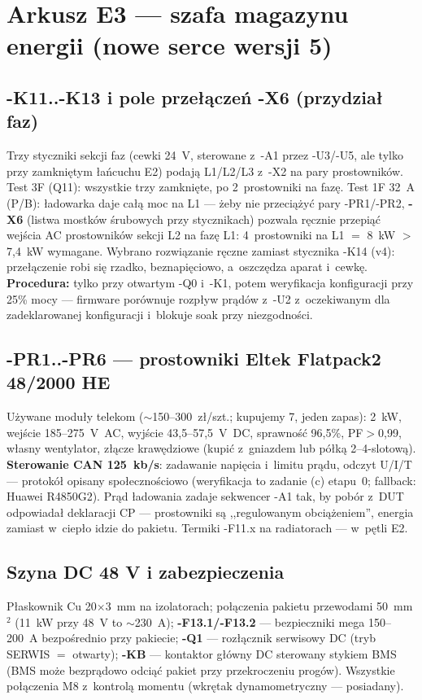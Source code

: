 \documentclass[11pt,a4paper]{article}
\begin{document}
\section{Arkusz E3 --- szafa magazynu energii (nowe serce wersji 5)}

\subsection{-K11..-K13 i pole przełączeń -X6 (przydział faz)}
Trzy styczniki sekcji faz (cewki 24~V, sterowane z~-A1 przez -U3/-U5, ale tylko przy zamkniętym łańcuchu E2)
podają L1/L2/L3 z~-X2 na pary prostowników. Test 3F (Q11): wszystkie trzy zamknięte, po 2~prostowniki na fazę.
Test 1F 32~A (P/B): ładowarka daje całą moc na L1 --- żeby nie przeciążyć pary -PR1/-PR2, \textbf{-X6}
(listwa mostków śrubowych przy stycznikach) pozwala ręcznie przepiąć wejścia AC prostowników sekcji L2 na
fazę L1: 4~prostowniki na L1 $=$ 8~kW $>$ 7,4~kW wymagane. Wybrano rozwiązanie ręczne zamiast stycznika -K14
(v4): przełączenie robi się rzadko, beznapięciowo, a~oszczędza aparat i~cewkę. \textbf{Procedura:} tylko przy
otwartym -Q0 i~-K1, potem weryfikacja konfiguracji przy 25\% mocy --- firmware porównuje rozpływ prądów
z~-U2 z~oczekiwanym dla zadeklarowanej konfiguracji i~blokuje soak przy niezgodności.

\subsection{-PR1..-PR6 --- prostowniki Eltek Flatpack2 48/2000 HE}
Używane moduły telekom ($\sim$150--300~zł/szt.; kupujemy 7, jeden zapas): 2~kW, wejście 185--275~V~AC,
wyjście 43,5--57,5~V~DC, sprawność 96,5\%, PF$>$0,99, własny wentylator, złącze krawędziowe (kupić z~gniazdem
lub półką 2--4-slotową). \textbf{Sterowanie CAN 125~kb/s}: zadawanie napięcia i~limitu prądu, odczyt U/I/T ---
protokół opisany społecznościowo (weryfikacja to zadanie (c) etapu~0; fallback: Huawei R4850G2). Prąd
ładowania zadaje sekwencer -A1 tak, by pobór z~DUT odpowiadał deklaracji CP --- prostowniki są ,,regulowanym
obciążeniem'', energia zamiast w~ciepło idzie do pakietu. Termiki -F11.x na radiatorach --- w~pętli E2.

\subsection{Szyna DC 48 V i zabezpieczenia}
Płaskownik Cu 20$\times$3~mm na izolatorach; połączenia pakietu przewodami 50~mm$^2$ (11~kW przy 48~V to
$\sim$230~A); \textbf{-F13.1/-F13.2} --- bezpieczniki mega 150--200~A bezpośrednio przy pakiecie;
\textbf{-Q1} --- rozłącznik serwisowy DC (tryb SERWIS $=$ otwarty); \textbf{-KB} --- kontaktor główny DC
sterowany stykiem BMS (BMS może bezprądowo odciąć pakiet przy przekroczeniu progów). Wszystkie połączenia
M8 z~kontrolą momentu (wkrętak dynamometryczny --- posiadany).
\end{document}

